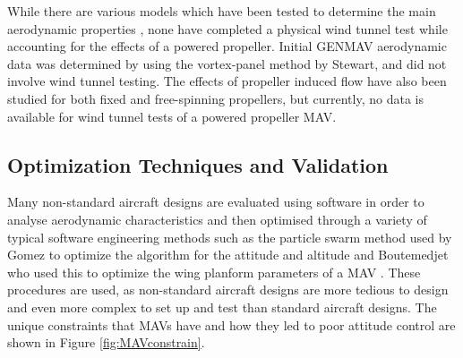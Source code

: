 While there are various models which have been tested to determine the main aerodynamic properties \cite{Stewart2007} \cite{Aboelezz2020}, none have completed a physical wind tunnel test while accounting for the effects of a powered propeller. Initial GENMAV aerodynamic data was determined by using the vortex-panel method by Stewart\cite{Stewart2007}, and did not involve wind tunnel testing. The effects of propeller induced flow have also been studied for both fixed and free-spinning propellers, but currently, no data is available for wind tunnel tests of a powered propeller MAV.

\subsection{Optimization Techniques and Validation}
\label{subsec:Optimization}
Many non-standard aircraft designs are evaluated using software in order to analyse aerodynamic characteristics and then optimised through a variety of typical software engineering methods such as the particle swarm method used by Gomez to optimize the algorithm for the attitude and altitude and Boutemedjet who used this to optimize the wing planform parameters of a MAV \cite{Gomez2020} \cite{Boutemedjet2019}. These procedures are used, as non-standard aircraft designs are more tedious to design and even more complex to set up and test than standard aircraft designs. The unique constraints that MAVs have and how they led to poor attitude control are shown in Figure \ref{fig:MAVconstrain}.

